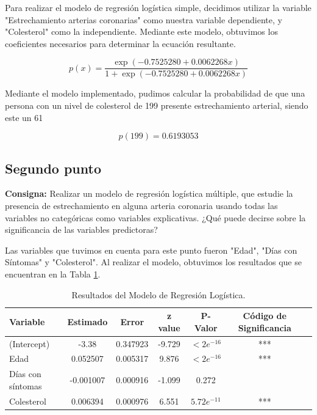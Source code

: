 \documentclass{article} %
\begin{document}
Para realizar el modelo de regresión logística simple, decidimos utilizar la variable "Estrechamiento arterias coronarias" como nuestra variable dependiente, y "Colesterol" como la independiente. Mediante este modelo, obtuvimos los coeficientes necesarios para determinar la ecuación resultante. 

\begin{equation}
p(x)=\frac{\exp(-0.7525280 + 0.0062268x)}{1 + \exp(-0.7525280 + 0.0062268x)}
\end{equation}

Mediante el modelo implementado, pudimos calcular la probabilidad de que una persona con un nivel de colesterol de 199 presente estrechamiento arterial, siendo este un 61%

\begin{equation}
p(199)=0.6193053
\end{equation}

\subsection{Segundo punto}

\textbf{Consigna:} Realizar un modelo de regresión logística múltiple, que estudie la presencia de estrechamiento en alguna arteria coronaria usando todas las variables no categóricas como variables explicativas. ¿Qué puede decirse sobre la significancia de las variables predictoras?

Las variables que tuvimos en cuenta para este punto fueron "Edad", "Días con Síntomas" y "Colesterol". Al realizar el modelo, obtuvimos los resultados que se encuentran en la Tabla \ref{tab:table-punto-2-2}.

\begin{table}[H]
	\centering
		\begin{tabular}{||l || c || c || c || c || c || c ||}
			\hline
			\hline
			Variable & Estimado & Error & z value & P-Valor & Código de Significancia\\
			\hline			
			\hline
			(Intercept) & -3.38 & 0.347923 & -9.729 & $<2e^{-16}$ & ***\\
			\hline
			Edad  & 0.052507 & 0.005317 & 9.876 & $<2e^{-16}$ & ***\\
			\hline
			Días con síntomas & -0.001007 & 0.000916 & -1.099 & 0.272 & \\
			\hline
			Colesterol & 0.006394 & 0.000976 & 6.551 & $5.72e^{-11}$ & ***\\
			\hline
			\hline
		\end{tabular}
		\caption{Resultados del Modelo de Regresión Logística.}
	\label{tab:table-punto-2-2}
\end{table}
\end{document}
